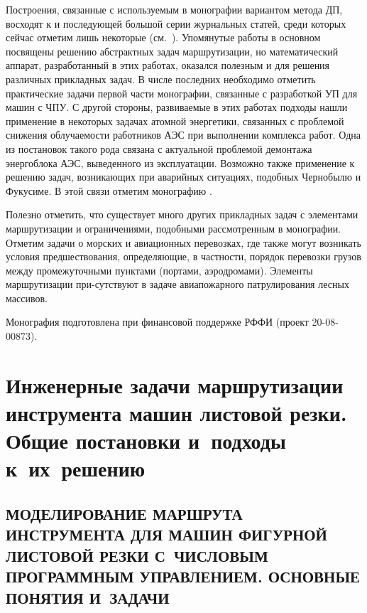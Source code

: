 \documentclass[11pt,twoside,openany]{report}
\begin{document}
Построения, связанные с используемым в монографии
вариантом метода ДП, восходят к
\cite{Cha1`} и последующей большой серии
журнальных статей,
среди которых сейчас отметим лишь некоторые
(см.~\cite{Cha8`,intro51,intro52,intro53,intro54,intro55,intro56}).
Упомянутые работы
\cite{Cha8`,intro51,intro52,intro53,intro54,intro55,intro56}
в основном посвящены решению абстрактных задач маршрутизации,
но математический аппарат, разработанный в этих работах,
оказался полезным и для решения различных прикладных задач.
В числе последних
необходимо
отметить практические задачи первой части монографии,
связанные с разработкой УП для машин с ЧПУ.
С другой стороны, развиваемые в этих работах подходы
нашли применение в некоторых задачах атомной энергетики,
связанных с проблемой снижения облучаемости работников АЭС
при выполнении комплекса работ.
Одна из постановок такого рода связана с
актуальной проблемой демонтажа энергоблока АЭС,
выведенного из эксплуатации.
Возможно также применение к решению задач,
возникающих при аварийных ситуациях,
подобных Чернобылю и Фукусиме.
В этой связи отметим монографию \cite{Cha2`}.

Полезно отметить, что существует много других прикладных задач
с элементами маршрутизации и ограничениями,
подобными рассмотренным в монографии.
Отметим задачи о морских и авиационных перевозках,
где также могут возникать условия предшествования,
определяющие, в частности, порядок перевозки грузов
между промежуточными пунктами (портами, аэродромами).
Элементы маршрутизации при-сутствуют в задаче
авиапожарного патрулирования лесных массивов.

Монография подготовлена при финансовой поддержке РФФИ
(проект 20-08-00873).


\part{
  Инженерные задачи
  маршрутизации инструмента машин листовой резки.
  Общие постановки
  и~подходы к~их~решению
}

\chapter{
  МОДЕЛИРОВАНИЕ МАРШРУТА ИНСТРУМЕНТА ДЛЯ МАШИН ФИГУРНОЙ ЛИСТОВОЙ РЕЗКИ
  С~ЧИСЛОВЫМ ПРОГРАММНЫМ УПРАВЛЕНИЕМ.
  ОСНОВНЫЕ ПОНЯТИЯ И~ЗАДАЧИ
}
\setcounter{chapter}{1}
\setcounter{equation}{0}
\end{document}
